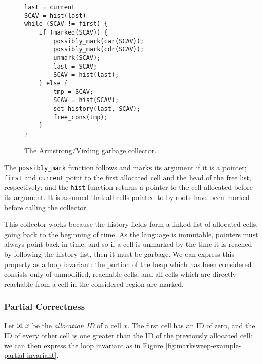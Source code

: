 \begin{figure}[t]
  \centering
  \begin{lstlisting}
last = current
SCAV = hist(last)
while (SCAV != first) {
    if (marked(SCAV)) {
        possibly_mark(car(SCAV));
        possibly_mark(cdr(SCAV));
        unmark(SCAV);
        last = SCAV;
        SCAV = hist(last);
    } else {
        tmp = SCAV;
        SCAV = hist(SCAV);
        set_history(last, SCAV);
        free_cons(tmp);
    }
}
  \end{lstlisting}
  \captionsetup{format=default}
  \caption{The Armstrong/Virding garbage collector.}
  \label{fig:marksweep-example-algo}
\end{figure}

The \texttt{possibly\_mark} function follows and marks its argument if
it is a pointer; \texttt{first} and \texttt{current} point to the
first allocated cell and the head of the free list, respectively; and
the \texttt{hist} function returns a pointer to the cell allocated
before its argument. It is assumed that all cells pointed to by roots
have been marked before calling the collector.

This collector works because the history fields form a linked list of
allocated cells, going back to the beginning of time. As the language
is immutable, pointers must always point back in time, and so if a
cell is unmarked by the time it is reached by following the history
list, then it must be garbage. We can express this property as a loop
invariant: the portion of the heap which has been considered consists
only of unmodified, reachable cells, and all cells which are directly
reachable from a cell in the considered region are marked.

\subsubsection{Partial Correctness}
\label{sec:marksweep-example-partial}

Let $\mathrm{id}~x$ be the \textit{allocation ID} of a cell $x$. The first
cell has an ID of zero, and the ID of every other cell is one greater
than the ID of the previously allocated cell: we can then express the
loop invariant as in Figure
\ref{fig:marksweep-example-partial-invariant}.

